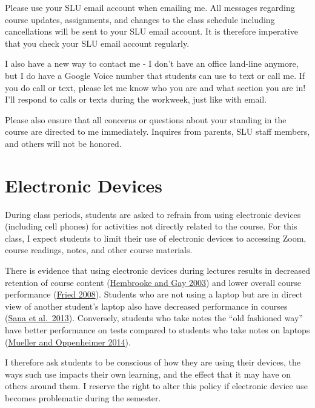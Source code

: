 \documentclass[
]{book}
\begin{document}
Please use your SLU email account when emailing me. All messages regarding course updates, assignments, and changes to the class schedule including cancellations will be sent to your SLU email account. It is therefore imperative that you check your SLU email account regularly.

I also have a new way to contact me - I don't have an office land-line anymore, but I do have a Google Voice number that students can use to text or call me. If you do call or text, please let me know who you are and what section you are in! I'll respond to calls or texts during the workweek, just like with email.

Please also ensure that all concerns or questions about your standing in the course are directed to me immediately. Inquires from parents, SLU staff members, and others will not be honored.

\hypertarget{electronic-devices}{%
\section{Electronic Devices}\label{electronic-devices}}

During class periods, students are asked to refrain from using electronic devices (including cell phones) for activities not directly related to the course. For this class, I expect students to limit their use of electronic devices to accessing Zoom, course readings, notes, and other course materials.

There is evidence that using electronic devices during lectures results in decreased retention of course content (\href{https://link.springer.com/article/10.1007/BF02940852}{Hembrooke and Gay 2003}) and lower overall course performance (\href{https://www.sciencedirect.com/science/article/pii/S0360131506001436}{Fried 2008}). Students who are not using a laptop but are in direct view of another student's laptop also have decreased performance in courses (\href{https://www.sciencedirect.com/science/article/pii/S0360131512002254}{Sana et al.~2013}). Conversely, students who take notes the ``old fashioned way'' have better performance on tests compared to students who take notes on laptops (\href{http://journals.sagepub.com/doi/abs/10.1177/0956797614524581}{Mueller and Oppenheimer 2014}).

I therefore ask students to be conscious of how they are using their devices, the ways such use impacts their own learning, and the effect that it may have on others around them. I reserve the right to alter this policy if electronic device use becomes problematic during the semester.
\end{document}
